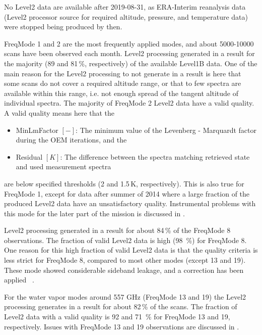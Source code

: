 No Level2 data are available after 2019-08-31, as 
ERA-Interim reanalysis data (Level2 processor source for
required altitude, pressure, and temperature data)
were stopped being produced by then.

FreqMode 1 and 2 are the most frequently applied modes, and
about 5000-10000 scans have been observed each month. Level2 processing
generated in a result for the majority (89 and 81\,\%, respectively) of
the available Level1B data. One of the main reason for the
Level2 processing to not generate in a result
is here that some scans do not cover a required
altitude range, or that to few spectra are available within this range,
i.e. not enough spread of the tangent altitude of individual spectra. 
The majority of FreqMode 2 Level2 data have a valid quality.
A valid quality means here that the 
\begin{itemize}

  \item MinLmFactor \([-]\): The minimum value of the Levenberg - Marquardt factor during the OEM iterations, and the

  \item Residual \([K]\):  The difference between the spectra matching retrieved state and
   used measurement spectra

\end{itemize}
are below specified thresholds (2 and 1.5\,K, respectively).
This is also true for FreqMode 1, except for data after summer
of 2014 where a large fraction of the produced Level2 data
have an unsatisfactory quality. Instrumental problems
with this mode for the later part of the mission is discussed
in \cite{dds}.

Level2 processing generated in a result for about 84\,\%
of the FreqMode 8 observations. The fraction of valid Level2
data is high (98 \,\%) for FreqMode 8.
One reason for this high fraction of valid Level2 data
is that the quality criteria is less strict for FreqMode 8,
compared to most other modes (except 13 and 19).
These mode showed considerable sideband leakage, and a correction
has been applied ~\cite{dds}. 


% 

For the water vapor modes around 557 GHz (FreqMode
13 and 19) the Level2 processing generates in a result for
about 82\,\% of the scans. The fraction of Level2 
data with a valid quality is 92 and 71 \,\% for FreqMode
13 and 19, respectively.
Issues with FreqMode 13 and 19 observations are discussed
in \cite{dds}.
 
